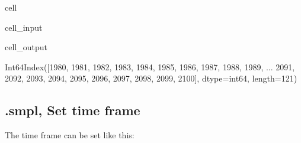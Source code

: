 \documentclass[letterpaper,10pt,english]{jupyterBook}
\begin{document}
\begin{sphinxuseclass}{cell}\begin{sphinxVerbatimInput}

\begin{sphinxuseclass}{cell_input}
\begin{sphinxVerbatim}[commandchars=\\\{\}]
  
\end{sphinxVerbatim}

\end{sphinxuseclass}\end{sphinxVerbatimInput}
\begin{sphinxVerbatimOutput}

\begin{sphinxuseclass}{cell_output}
\begin{sphinxVerbatim}[commandchars=\\\{\}]
Int64Index([1980, 1981, 1982, 1983, 1984, 1985, 1986, 1987, 1988, 1989,
            ...
            2091, 2092, 2093, 2094, 2095, 2096, 2097, 2098, 2099, 2100],
           dtype=\PYGZsq{}int64\PYGZsq{}, length=121)
\end{sphinxVerbatim}

\end{sphinxuseclass}\end{sphinxVerbatimOutput}

\end{sphinxuseclass}

\subsection{.smpl, Set time frame}
\label{\detokenize{content/Python/modelflow_features:smpl-set-time-frame}}
\sphinxAtStartPar
The time frame can be set like this:
\end{document}
